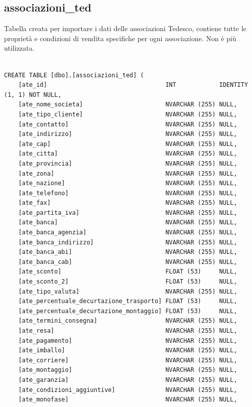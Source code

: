 \documentclass[12pt]{article}
\begin{document}
\subsection{associazioni\_ted}
Tabella creata per importare i dati delle associazioni Tedesco, contiene tutte le proprietà e condizioni di vendita specifiche per ogni associazione.
Non è più utilizzata.
\begin{lstlisting}

CREATE TABLE [dbo].[associazioni_ted] (
    [ate_id]                                 INT            IDENTITY (1, 1) NOT NULL,
    [ate_nome_societa]                       NVARCHAR (255) NULL,
    [ate_tipo_cliente]                       NVARCHAR (255) NULL,
    [ate_contatto]                           NVARCHAR (255) NULL,
    [ate_indirizzo]                          NVARCHAR (255) NULL,
    [ate_cap]                                NVARCHAR (255) NULL,
    [ate_citta]                              NVARCHAR (255) NULL,
    [ate_provincia]                          NVARCHAR (255) NULL,
    [ate_zona]                               NVARCHAR (255) NULL,
    [ate_nazione]                            NVARCHAR (255) NULL,
    [ate_telefono]                           NVARCHAR (255) NULL,
    [ate_fax]                                NVARCHAR (255) NULL,
    [ate_partita_iva]                        NVARCHAR (255) NULL,
    [ate_banca]                              NVARCHAR (255) NULL,
    [ate_banca_agenzia]                      NVARCHAR (255) NULL,
    [ate_banca_indirizzo]                    NVARCHAR (255) NULL,
    [ate_banca_abi]                          NVARCHAR (255) NULL,
    [ate_banca_cab]                          NVARCHAR (255) NULL,
    [ate_sconto]                             FLOAT (53)     NULL,
    [ate_sconto_2]                           FLOAT (53)     NULL,
    [ate_tipo_valuta]                        NVARCHAR (255) NULL,
    [ate_percentuale_decurtazione_trasporto] FLOAT (53)     NULL,
    [ate_percentuale_decurtazione_montaggio] FLOAT (53)     NULL,
    [ate_termini_consegna]                   NVARCHAR (255) NULL,
    [ate_resa]                               NVARCHAR (255) NULL,
    [ate_pagamento]                          NVARCHAR (255) NULL,
    [ate_imballo]                            NVARCHAR (255) NULL,
    [ate_corriere]                           NVARCHAR (255) NULL,
    [ate_montaggio]                          NVARCHAR (255) NULL,
    [ate_garanzia]                           NVARCHAR (255) NULL,
    [ate_condizioni_aggiuntive]              NVARCHAR (255) NULL,
    [ate_monofase]                           NVARCHAR (255) NULL,

\end{lstlisting}
\end{document}
